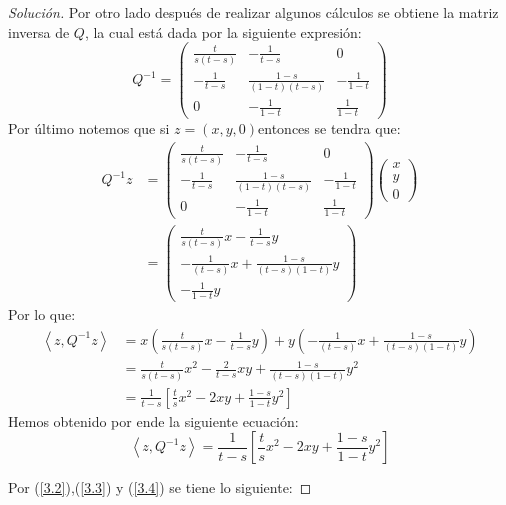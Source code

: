 \documentclass[11pt,notitlepage]{article}
\newenvironment{solucion}
  {\begin{proof}[Solución]}
  {\end{proof}}
\begin{document}
\begin{solucion}
Por otro lado después de realizar
algunos cálculos se obtiene la matriz inversa de \(Q\), la cual está dada por la siguiente expresión: 
\[
    Q^{-1} = \begin{pmatrix}
\frac{t}{s(t-s)} &-\frac{1}{t-s}  &0 \\ 
-\frac{1}{t-s} &\frac{1-s}{(1-t)(t-s)}  &-\frac{1}{1-t} \\ 
0 &-\frac{1}{1-t}  &\frac{1}{1-t} 
\end{pmatrix}
\]
Por último notemos que si \(z =  (x,y,0)\)entonces se tendra que: 
\begin{align*}
     Q^{-1}z   &= \begin{pmatrix}
\frac{t}{s(t-s)} &-\frac{1}{t-s}  &0 \\ 
-\frac{1}{t-s} &\frac{1-s}{(1-t)(t-s)}  &-\frac{1}{1-t} \\ 
0 &-\frac{1}{1-t}  &\frac{1}{1-t} 
\end{pmatrix}\begin{pmatrix}
x\\ 
y\\ 
0
\end{pmatrix}\\
              &= \begin{pmatrix}
\frac{t}{s(t-s)}x - \frac{1}{t-s}y\\ 
-\frac{1}{(t-s)}x + \frac{1-s}{(t-s)(1-t)}y\\ 
- \frac{1}{1-t}y
\end{pmatrix}
\end{align*}
Por lo que: 
\begin{align*}
    \left<z,Q^{-1}z\right> &= x\left(\frac{t}{s(t-s)}x - \frac{1}{t-s}y\right) + y\left(-\frac{1}{(t-s)}x + \frac{1-s}{(t-s)(1-t)}y\right)\\ 
                           &= \frac{t}{s(t-s)}x^2 - \frac{2}{t-s}xy   + \frac{1-s}{(t-s)(1-t)}y^2\\
                           &= \frac{1}{t-s}\left[\frac{t}{s}x^2 - 2xy   + \frac{1-s}{1-t}y^2 \right]
\end{align*}
Hemos obtenido por ende la siguiente ecuación:
\begin{equation}\label{3.4}
     \left<z,Q^{-1}z\right> = \frac{1}{t-s}\left[\frac{t}{s}x^2 - 2xy   + \frac{1-s}{1-t}y^2 \right]
\end{equation}

Por (\ref{3.2}),(\ref{3.3}) y (\ref{3.4}) se tiene lo siguiente: 


\end{solucion}
\end{document}

